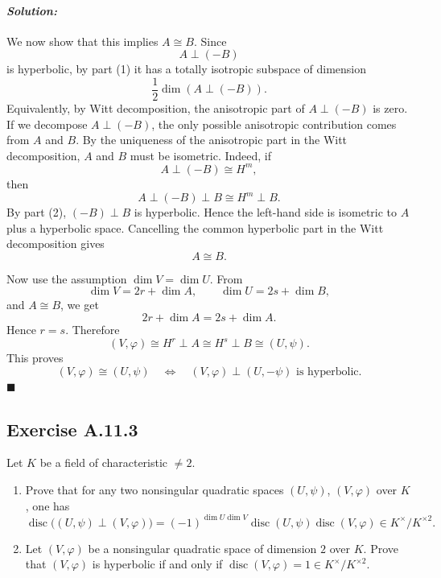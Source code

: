 \documentclass[12pt, a4paper]{article}
\newenvironment{solution}
  {\paragraph{\textit{Solution:}}\par\medskip}
  {\hfill$\blacksquare$\vspace{0.1cm}}
\begin{document}
\begin{solution}
We now show that this implies \(A\cong B\). Since
\[
A\perp (-B)
\]
is hyperbolic, by part (1) it has a totally isotropic subspace of dimension
\[
\frac{1}{2}\dim(A\perp (-B)).
\]
Equivalently, by Witt decomposition, the anisotropic part of
\(A\perp (-B)\) is zero. If we decompose \(A\perp (-B)\), the only possible
anisotropic contribution comes from \(A\) and \(B\). By the uniqueness of the
anisotropic part in the Witt decomposition, \(A\) and \(B\) must be isometric.
Indeed, if
\[
A\perp (-B)\cong H^m,
\]
then
\[
A\perp (-B)\perp B\cong H^m\perp B.
\]
By part (2), \((-B)\perp B\) is hyperbolic. Hence the left-hand side is
isometric to \(A\) plus a hyperbolic space. Cancelling the common hyperbolic
part in the Witt decomposition gives
\[
A\cong B.
\]

Now use the assumption \(\dim V=\dim U\). From
\[
\dim V=2r+\dim A,
\qquad
\dim U=2s+\dim B,
\]
and \(A\cong B\), we get
\[
2r+\dim A=2s+\dim A.
\]
Hence \(r=s\). Therefore
\[
(V,\varphi)\cong H^r\perp A
\cong
H^s\perp B
\cong
(U,\psi).
\]
This proves
\[
(V,\varphi)\cong (U,\psi)
\quad\Longleftrightarrow\quad
(V,\varphi)\perp (U,-\psi)\text{ is hyperbolic}.
\]
\end{solution}


\subsection*{Exercise A.11.3}

Let $K$ be a field of characteristic $\neq 2$.

\begin{enumerate}
    \item Prove that for any two nonsingular quadratic spaces $(U,\psi)$, $(V,\varphi)$ over $K$, one has
    \[
        \operatorname{disc}\bigl((U,\psi)\perp (V,\varphi)\bigr)
        =
        (-1)^{\dim U \dim V}
        \operatorname{disc}(U,\psi)\operatorname{disc}(V,\varphi)
        \in K^{\times}/K^{\times 2}.
    \]

    \item Let $(V,\varphi)$ be a nonsingular quadratic space of dimension $2$ over $K$. Prove that $(V,\varphi)$ is hyperbolic if and only if $\operatorname{disc}(V,\varphi)=1\in K^{\times}/K^{\times 2}$.
\end{enumerate}
\end{document}
